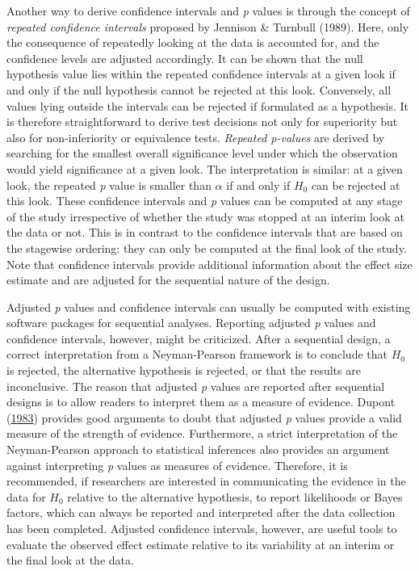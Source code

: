 \documentclass[
  english,
  ,man,floatsintext]{apa6}
\begin{document}
Another way to derive confidence intervals and \emph{p} values is through the concept of \emph{repeated confidence intervals} proposed by Jennison \& Turnbull (1989). Here, only the consequence of repeatedly looking at the data is accounted for, and the confidence levels are adjusted accordingly. It can be shown that the null hypothesis value lies within the repeated confidence intervals at a given look if and only if the null hypothesis cannot be rejected at this look. Conversely, all values lying outside the intervals can be rejected if formulated as a hypothesis. It is therefore straightforward to derive test decisions not only for superiority but also for non-inferiority or equivalence tests. \emph{Repeated p-values} are derived by searching for the smallest overall significance level under which the observation would yield significance at a given look. The interpretation is similar: at a given look, the repeated \emph{p} value is smaller than \(\alpha\) if and only if \(H_0\) can be rejected at this look. These confidence intervals and \emph{p} values can be computed at any stage of the study irrespective of whether the study was stopped at an interim look at the data or not. This is in contrast to the confidence intervals that are based on the stagewise ordering: they can only be computed at the final look of the study. Note that confidence intervals provide additional information about the effect size estimate and are adjusted for the sequential nature of the design.

Adjusted \emph{p} values and confidence intervals can usually be computed with existing software packages for sequential analyses. Reporting adjusted \emph{p} values and confidence intervals, however, might be criticized. After a sequential design, a correct interpretation from a Neyman-Pearson framework is to conclude that \(H_0\) is rejected, the alternative hypothesis is rejected, or that the results are inconclusive. The reason that adjusted \emph{p} values are reported after sequential designs is to allow readers to interpret them as a measure of evidence. Dupont (\protect\hyperlink{ref-dupont_sequential_1983}{1983}) provides good arguments to doubt that adjusted \emph{p} values provide a valid measure of the strength of evidence. Furthermore, a strict interpretation of the Neyman-Pearson approach to statistical inferences also provides an argument against interpreting \emph{p} values as measures of evidence. Therefore, it is recommended, if researchers are interested in communicating the evidence in the data for \(H_0\) relative to the alternative hypothesis, to report likelihoods or Bayes factors, which can always be reported and interpreted after the data collection has been completed. Adjusted confidence intervals, however, are useful tools to evaluate the observed effect estimate relative to its variability at an interim or the final look at the data.
\end{document}
